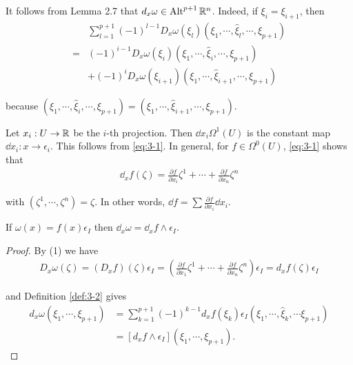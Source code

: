 It follows from Lemma 2.7 that $d_x\omega\in\operatorname{Alt}^{p+1}\mathbb{R}^n$. Indeed, if $\xi_i = \xi_{i+1}$, then 
\begin{align*}
    &\sum_{l=1}^{p+1}\left(-1\right)^{l-1}D_{x}\omega(\xi_{l})(\xi_{1},\cdots,\hat{\xi}_{l},\cdots,\xi_{p+1}) \\
  = & (-1)^{i-1}D_{x}\omega(\xi_{i})(\xi_{1},\cdots,\hat{\xi}_{i},\cdots,\xi_{p+1}) \\
    & +(-1)^{{i}}D_{{x}}\omega(\xi_{{i+1}})(\xi_{1},\cdots,\hat{\xi}_{{i+1}},\cdots,\xi_{{p+1}})
\end{align*}


because $(\xi_1, \cdots, \hat{\xi}_i, \cdots, \xi_{p+1}) = (\xi_1, \cdots, \hat{\xi}_{i+1}, \cdots, \xi_{p+1})$.

\begin{example}\label{example:3-3}
  Let $x_i:U\to \mathbb{R}$ be the $i$-th projection. Then $\dd x_i \Omega^1(U)$ is the
  constant map $\dd x_i:x\to \epsilon_i$. This follows from \eqref{eq:3-1}. In general, for $f\in\Omega^0(U)$,
  \eqref{eq:3-1} shows that
  \begin{align}\label{eq:3-2}
    \dd_x f(\zeta) = \frac{\partial f }{\partial x_i }\zeta^1 + \cdots + \frac{\partial f}{\partial x_n}\zeta^n
  \end{align}

  with $(\zeta^1, \cdots, \zeta^n) = \zeta$. In other words, $\dd f = \sum{\frac{\partial f}{\partial x_i}\dd x_i}$.  
\end{example}


\begin{lemma}\label{lemma:3-1}
  If $\omega(x) = f(x)\epsilon_I$ then $\dd_x\omega = \dd_xf\wedge\epsilon_I$.
\end{lemma}

\begin{proof}
  By (1) we have
  \begin{align*}
    D_x\omega(\zeta)
    = (D_xf)(\zeta)\epsilon_I
    = \left(\frac{\partial f}{\partial x_1}\zeta^1+\cdots+\frac{\partial f}{\partial x_n}\zeta^n\right)\epsilon_I
    = d_xf(\zeta)\epsilon_I
  \end{align*}

  and Definition \ref{def:3-2} gives
  \begin{align*}
    d_{x}\omega(\xi_{1},\cdots,\xi_{p+1}) 
    & = \sum_{k=1}^{p+1}\left(-1\right)^{k-1}d_{x}f(\xi_{k})\epsilon_{I}\left(\xi_{1},\cdots,\hat{\xi}_{k},\cdots\xi_{p+1}\right) \\
    & = [d_{x}f\wedge\epsilon_{I}](\xi_{1},\cdots,\xi_{p+1}). 
  \end{align*}
\end{proof}

